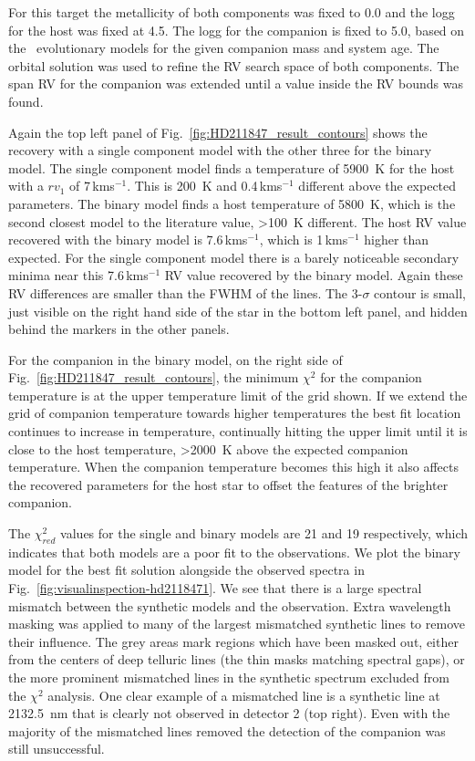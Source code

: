 \documentclass[fleqn,usenatbib]{mnras}
\newcommand{\kmps}{\,kms\(^{-1}\)}	%
\begin{document}
For this target the metallicity of both components was fixed to 0.0 and the logg for the host was fixed at 4.5. The logg for the companion is fixed to 5.0, based on the~\citet{baraffe_new_2015} evolutionary models for the given companion mass and system age. The orbital solution was used to refine the RV search space of both components. The span RV for the companion was extended until a value inside the RV bounds was found.

Again the top left panel of Fig.~\ref{fig:HD211847_result_contours} shows the recovery with a single component model with the other three for the binary model. The single component model finds a temperature of 5900~K for the host with a \({rv}_1\) of 7\kmps{}. This is 200~K and 0.4\kmps{} different above the expected parameters. The binary model finds a host temperature of 5800~K, which is the second closest model to the literature value, >100~K different. The host RV value recovered with the binary model is 7.6\kmps{}, which is 1\kmps{} higher than expected.  For the single component model there is a barely noticeable secondary minima near this 7.6\kmps{} RV value recovered by the binary model. Again these RV differences are smaller than the FWHM of the lines. The 3-\(\sigma\) contour is small, just visible on the right hand side of the star in the bottom left panel, and hidden behind the markers in the other panels. 


For the companion in the binary model, on the right side of Fig.~\ref{fig:HD211847_result_contours}, the minimum \(\chi^2\) for the companion temperature is at the upper temperature limit of the grid shown. If we extend the grid of companion temperature towards higher temperatures the best fit location continues to increase in temperature, continually hitting the upper limit until it is close to the host temperature, >2000~K above the expected companion temperature. When the companion temperature becomes this high it also affects the recovered parameters for the host star to offset the features of the brighter companion. 

The \(\chi^2_{red}\) values for the single and binary models are 21 and 19 respectively, which indicates that both models are a poor fit to the observations. We plot the binary model for the best fit solution alongside the observed spectra in Fig.~\ref{fig:visualinspection-hd2118471}. We see that there is a large spectral mismatch between the synthetic models and the observation. Extra wavelength masking was applied to many of the largest mismatched synthetic lines to remove their influence. The grey areas mark regions which have been masked out, either from the centers of deep telluric lines (the thin masks matching spectral gaps), or the more prominent mismatched lines in the synthetic spectrum excluded from the \(\chi^2\) analysis. One clear example of a mismatched line is a synthetic line at 2132.5~nm that is clearly not observed in detector 2 (top right). Even with the majority of the mismatched lines removed the detection of the companion was still unsuccessful.
\end{document}
